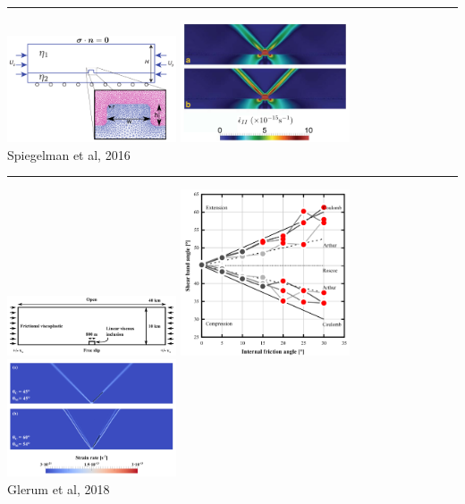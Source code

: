 \begin{center}\noindent\rule{8cm}{0.4pt}\end{center}

\begin{center}
\includegraphics[width=5cm]{images/benchmark_brick/spmw16a}
\includegraphics[width=5cm]{images/benchmark_brick/spmw16b}\\
{\captionfont Spiegelman et al, 2016 \cite{spmw16}}
\end{center}

\begin{center}\noindent\rule{8cm}{0.4pt}\end{center}

\begin{center}
\includegraphics[width=5cm]{images/benchmark_brick/gltf18a}
\includegraphics[width=5cm]{images/benchmark_brick/gltf18b}
\includegraphics[width=5cm]{images/benchmark_brick/gltf18c}\\
{\captionfont Glerum et al, 2018 \cite{gltf18}}
\end{center}

